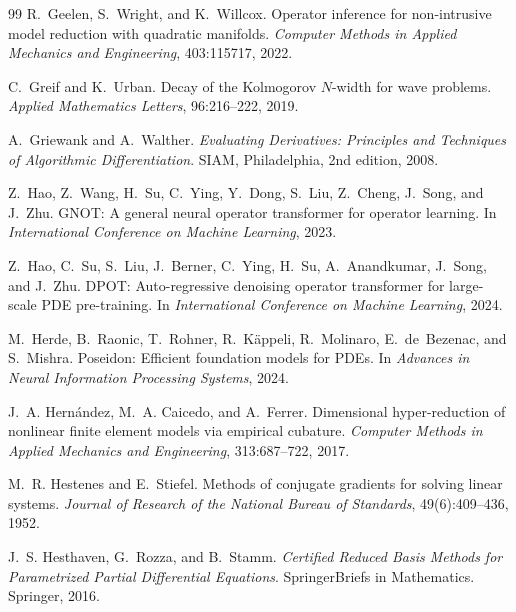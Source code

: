 \begin{thebibliography}{99}
R.~Geelen, S.~Wright, and K.~Willcox.
\newblock Operator inference for non-intrusive model reduction with
quadratic manifolds.
\newblock \emph{Computer Methods in Applied Mechanics and Engineering},
403:115717, 2022.

C.~Greif and K.~Urban.
\newblock Decay of the Kolmogorov $N$-width for wave problems.
\newblock \emph{Applied Mathematics Letters}, 96:216--222, 2019.

A.~Griewank and A.~Walther.
\newblock \emph{Evaluating Derivatives: Principles and Techniques of
Algorithmic Differentiation}.
\newblock SIAM, Philadelphia, 2nd edition, 2008.

Z.~Hao, Z.~Wang, H.~Su, C.~Ying, Y.~Dong, S.~Liu, Z.~Cheng, J.~Song,
and J.~Zhu.
\newblock GNOT: A general neural operator transformer for operator
learning.
\newblock In \emph{International Conference on Machine Learning}, 2023.

Z.~Hao, C.~Su, S.~Liu, J.~Berner, C.~Ying, H.~Su, A.~Anandkumar,
J.~Song, and J.~Zhu.
\newblock DPOT: Auto-regressive denoising operator transformer for
large-scale PDE pre-training.
\newblock In \emph{International Conference on Machine Learning}, 2024.

M.~Herde, B.~Raonic, T.~Rohner, R.~K\"appeli, R.~Molinaro,
E.~de~Bezenac, and S.~Mishra.
\newblock Poseidon: Efficient foundation models for PDEs.
\newblock In \emph{Advances in Neural Information Processing Systems},
2024.

J.~A. Hern\'andez, M.~A. Caicedo, and A.~Ferrer.
\newblock Dimensional hyper-reduction of nonlinear finite element
models via empirical cubature.
\newblock \emph{Computer Methods in Applied Mechanics and Engineering},
313:687--722, 2017.

M.~R. Hestenes and E.~Stiefel.
\newblock Methods of conjugate gradients for solving linear systems.
\newblock \emph{Journal of Research of the National Bureau of Standards},
49(6):409--436, 1952.

J.~S. Hesthaven, G.~Rozza, and B.~Stamm.
\newblock \emph{Certified Reduced Basis Methods for Parametrized
Partial Differential Equations}.
\newblock SpringerBriefs in Mathematics. Springer, 2016.


\end{thebibliography}
